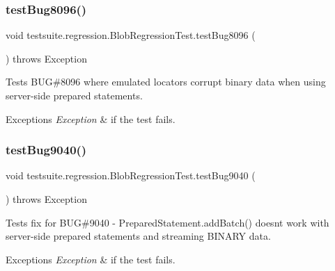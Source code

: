 \subsubsection{\texorpdfstring{test\+Bug8096()}{testBug8096()}}
{\footnotesize\ttfamily void testsuite.\+regression.\+Blob\+Regression\+Test.\+test\+Bug8096 (\begin{DoxyParamCaption}{ }\end{DoxyParamCaption}) throws Exception}

Tests B\+UG\#8096 where emulated locators corrupt binary data when using server-\/side prepared statements.


\begin{DoxyExceptions}{Exceptions}
{\em Exception} & if the test fails. \\
\hline
\end{DoxyExceptions}
\mbox{\label{classtestsuite_1_1regression_1_1_blob_regression_test_ac14a4cb77c1dd15dae977435a20e0880}} 
\subsubsection{\texorpdfstring{test\+Bug9040()}{testBug9040()}}
{\footnotesize\ttfamily void testsuite.\+regression.\+Blob\+Regression\+Test.\+test\+Bug9040 (\begin{DoxyParamCaption}{ }\end{DoxyParamCaption}) throws Exception}

Tests fix for B\+UG\#9040 -\/ Prepared\+Statement.\+add\+Batch() doesn\textquotesingle{}t work with server-\/side prepared statements and streaming B\+I\+N\+A\+RY data.


\begin{DoxyExceptions}{Exceptions}
{\em Exception} & if the test fails. \\
\hline
\end{DoxyExceptions}
\mbox{\label{classtestsuite_1_1regression_1_1_blob_regression_test_aa201dca2fdcf014a75210d531656ab98}} 

